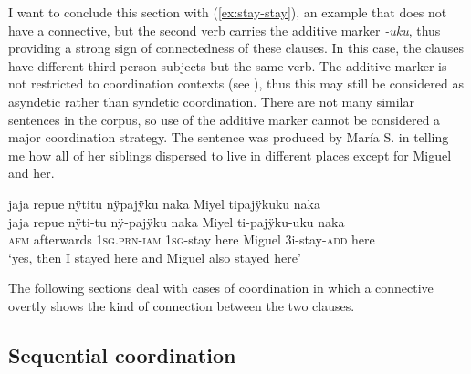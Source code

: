 

I want to conclude this section with (\ref{ex:stay-stay}), an example that does not have a connective, but the second verb carries the additive marker \textit{-uku}, thus providing a strong sign of connectedness of these clauses. In this case, the clauses have different third person subjects but the same verb. The additive marker is not restricted to coordination contexts (see ), thus this may still be considered as asyndetic rather than syndetic coordination. There are not many similar sentences in the corpus, so use of the additive marker cannot be considered a major coordination strategy.  The sentence was produced by María S. in telling me how all of her siblings dispersed to live in different places except for Miguel and her.

\ea\label{ex:stay-stay}
\begingl
\glpreamble jaja repue nÿtitu nÿpajÿku naka Miyel tipajÿkuku naka\\
\gla jaja repue nÿti-tu nÿ-pajÿku naka Miyel ti-pajÿku-uku naka\\
\glb \textsc{afm} afterwards 1\textsc{sg.prn}-\textsc{iam} 1\textsc{sg}-stay here Miguel 3i-stay-\textsc{add} here\\
\glft ‘yes, then I stayed here and Miguel also stayed here’
\endgl
\trailingcitation{[rxx-p181101l-2.267]}
\xe

The following sections deal with cases of coordination in which a connective overtly shows the kind of connection between the two clauses.

%
%


\subsection{Sequential coordination}\label{sec:SequentialCoordination}

